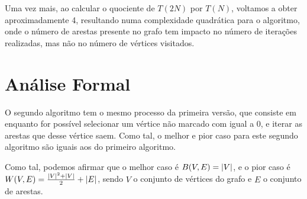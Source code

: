 Uma vez mais, ao calcular o quociente de $T(2N)$ por $T(N)$, voltamos a obter
aproximadamente 4, resultando numa complexidade quadrática para o algoritmo,
onde o número de arestas presente no grafo tem impacto no número de iterações
realizadas, mas não no número de vértices visitados.

\section{Análise Formal}

O segundo algoritmo tem o mesmo processo da primeira versão,
que consiste em enquanto for possível selecionar um vértice
não marcado com  igual a 0, e iterar as
arestas que desse vértice saem. Como tal, o melhor e pior
caso para este segundo algoritmo são iguais aos do primeiro
algoritmo.

Como tal, podemos afirmar que o melhor caso é $B(V, E) = \left\lvert V \right\rvert$,
e o pior caso é $W(V,E) = \frac{\left\lvert V \right\rvert^2 + \left\lvert V \right\rvert}{2} + \left\lvert E \right\rvert$,
sendo $V$ o conjunto de vértices do grafo e $E$ o conjunto de arestas.
